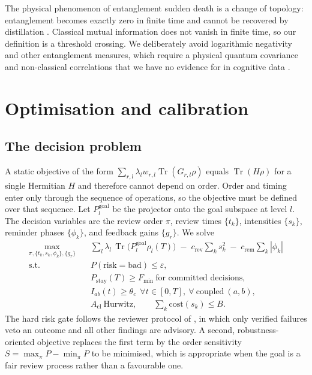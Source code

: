 \documentclass[11pt]{article}
\theoremstyle{definition}
\theoremstyle{remark}
\newcommand{\tr}{\operatorname{Tr}}
\begin{document}
The physical phenomenon of entanglement sudden death is a change of topology: entanglement becomes exactly zero in finite time and cannot be recovered by distillation \citep{yamamoto2008pra}. Classical mutual information does not vanish in finite time, so our definition is a threshold crossing. We deliberately avoid logarithmic negativity and other entanglement measures, which require a physical quantum covariance and non-classical correlations that we have no evidence for in cognitive data \citep{dzhafarov2016}.

\section{Optimisation and calibration}
\label{sec:opt}

\subsection{The decision problem}
A static objective of the form $\sum_{r,l}\lambda_l w_{r,l}\tr(G_{r,l}\rho)$ equals $\tr(H\rho)$ for a single Hermitian $H$ and therefore cannot depend on order. Order and timing enter only through the sequence of operations, so the objective must be defined over that sequence. Let $P_l^{\mathrm{goal}}$ be the projector onto the goal subspace at level $l$. The decision variables are the review order $\pi$, review times $\{t_k\}$, intensities $\{s_k\}$, reminder phases $\{\phi_k\}$, and feedback gains $\{g_r\}$. We solve
\begin{align}
\max_{\pi,\{t_k,s_k,\phi_k\},\{g_r\}}\quad & \sum_l \lambda_l\,\tr\!\big(P_l^{\mathrm{goal}}\rho_l(T)\big)\;-\;c_{\mathrm{rev}}\sum_k s_k^2\;-\;c_{\mathrm{rem}}\sum_k|\phi_k| \label{eq:obj}\\
\text{s.t.}\quad & P(\text{risk}=\text{bad})\le\varepsilon, \tag{hard risk gate}\\
& P_{\mathrm{stay}}(T)\ge F_{\min}\ \text{for committed decisions}, \tag{stability}\\
& I_{ab}(t)\ge\theta_c\ \ \forall t\in[0,T],\ \forall\ \text{coupled}\ (a,b), \tag{no coordination death}\\
& A_{\mathrm{cl}}\ \text{Hurwitz},\qquad \textstyle\sum_k \mathrm{cost}(s_k)\le B. \tag{stability, budget}
\end{align}
The hard risk gate follows the reviewer protocol of \citet{ye2026agonalpha}, in which only verified failures veto an outcome and all other findings are advisory. A second, robustness-oriented objective replaces the first term by the order sensitivity $S=\max_\pi P-\min_\pi P$ to be minimised, which is appropriate when the goal is a fair review process rather than a favourable one.
\end{document}
